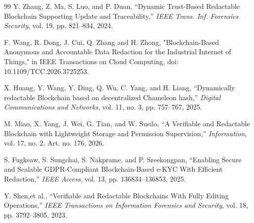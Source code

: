\documentclass[lettersize,journal]{IEEEtran}
\begin{document}
\begin{thebibliography}{99}
Y. Zhang, Z. Ma, S. Luo, and P. Duan,
``Dynamic Trust-Based Redactable Blockchain Supporting Update and Traceability,''
\textit{IEEE Trans. Inf. Forensics Security}, vol. 19, pp. 821--834, 2024.

F. Wang, R. Dong, J. Cui, Q. Zhang and H. Zhong, "Blockchain-Based Anonymous and Accountable Data Redaction for the Industrial Internet of Things," in IEEE Transactions on Cloud Computing, doi: 10.1109/TCC.2026.3725253.

X. Huang, Y. Wang, Y. Ding, Q. Wu, C. Yang, and H. Liang,
``Dynamically redactable Blockchain based on decentralized Chameleon hash,''
\textit{Digital Communications and Networks}, vol. 11, no. 3, pp. 757--767, 2025.

M. Miao, X. Yang, J. Wei, G. Tian, and W. Susilo,
``A Verifiable and Redactable Blockchain with Lightweight Storage and Permission Supervision,''
\textit{Information}, vol. 17, no. 2, Art. no. 176, 2026.

S. Fugkeaw, S. Sungchai, S. Nakprame, and P. Sreekongpan,
``Enabling Secure and Scalable GDPR-Compliant Blockchain-Based e-KYC With Efficient Redaction,''
\textit{IEEE Access}, vol. 13, pp. 136834--136853, 2025.

Y. Shen,et al.,
``Verifiable and Redactable Blockchains With Fully Editing Operations,''
\textit{IEEE Transactions on Information Forensics and Security}, vol. 18, pp. 3792--3805, 2023.

\end{thebibliography}
\end{document}
